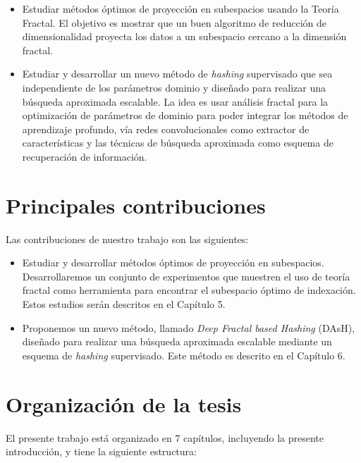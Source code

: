 \begin{itemize}
  \item  Estudiar  métodos óptimos de proyección  en subespacios usando la Teoría Fractal.  El objetivo es   mostrar que un buen algoritmo de reducción de dimensionalidad  proyecta los datos a un subespacio cercano a la dimensión fractal.

  \item  Estudiar y desarrollar un nuevo método de \textit{hashing} supervisado que sea independiente de los parámetros dominio y  diseñado para realizar una búsqueda  aproximada escalable.    La idea es usar análisis fractal para la optimización de parámetros de dominio para poder integrar los métodos de aprendizaje profundo, vía redes convolucionales como extractor de características y las técnicas de búsqueda aproximada como esquema de recuperación de información.
\end{itemize}
 

\section{Principales contribuciones}

 

Las contribuciones de nuestro trabajo son las siguientes:
\begin{itemize}

    \item  Estudiar y desarrollar  métodos óptimos de proyección en subespacios. Desarrollaremos un conjunto de experimentos que muestren el uso de teoría fractal como herramienta para encontrar  el subespacio óptimo  de indexación.    Estos estudios serán   descritos en el Capítulo 5.

  \item Proponemos un nuevo método, llamado \textit{Deep Fractal based  Hashing} (DAsH), diseñado para realizar una búsqueda aproximada escalable mediante un esquema de \textit{hashing} supervisado. Este método es descrito en el Capítulo 6.
\end{itemize}

\section{Organización de la tesis}

El presente trabajo está organizado en 7 capítulos, incluyendo la presente introducción, y tiene la  siguiente estructura:


